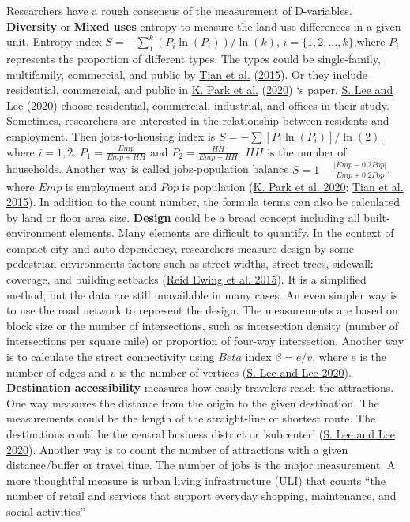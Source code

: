 \documentclass[
  12pt,
]{article}
\begin{document}
Researchers have a rough consensus of the measurement of D-variables. \textbf{Diversity} or \textbf{Mixed uses} entropy to measure the land-use differences in a given unit. Entropy index \(S= -\sum_1^k(P_i\ln(P_i))/\ln(k)\), \(i =\{1,2,...,k\}\),where \(P_i\)represents the proportion of different types. The types could be single-family, multifamily, commercial, and public by \protect\hyperlink{ref-tianTrafficGeneratedMixedUse2015}{Tian et al.} (\protect\hyperlink{ref-tianTrafficGeneratedMixedUse2015}{2015}). Or they include residential, commercial, and public in \protect\hyperlink{ref-parkGuidelinesPolycentricRegion2020}{K. Park et al.} (\protect\hyperlink{ref-parkGuidelinesPolycentricRegion2020}{2020}) `s paper. \protect\hyperlink{ref-leeComparingImpactsLocal2020}{S. Lee and Lee} (\protect\hyperlink{ref-leeComparingImpactsLocal2020}{2020}) choose residential, commercial, industrial, and offices in their study. Sometimes, researchers are interested in the relationship between residents and employment. Then jobs-to-housing index is \(S= -\sum[P_i\ln(P_i)]/\ln(2)\), where \(i=1,2\). \(P_1=\frac{Emp}{Emp+HH}\) and \(P_2=\frac{HH}{Emp+HH}\). \(HH\) is the number of households. Another way is called jobs-population balance \(S= 1-\frac{|Emp-0.2 Pop|}{Emp+0.2 Pop}\), where \(Emp\) is employment and \(Pop\) is population (\protect\hyperlink{ref-parkGuidelinesPolycentricRegion2020}{K. Park et al. 2020}; \protect\hyperlink{ref-tianTrafficGeneratedMixedUse2015}{Tian et al. 2015}). In addition to the count number, the formula terms can also be calculated by land or floor area size. \textbf{Design} could be a broad concept including all built-environment elements. Many elements are difficult to quantify. In the context of compact city and auto dependency, researchers measure design by some pedestrian-environments factors such as street widths, street trees, sidewalk coverage, and building setbacks (\protect\hyperlink{ref-ewingVaryingInfluencesBuilt2015}{Reid Ewing et al. 2015}). It is a simplified method, but the data are still unavailable in many cases. An even simpler way is to use the road network to represent the design. The measurements are based on block size or the number of intersections, such as intersection density (number of intersections per square mile) or proportion of four-way intersection. Another way is to calculate the street connectivity using \(Beta\) index \(\beta= e/v\), where \(e\) is the number of edges and \(v\) is the number of vertices (\protect\hyperlink{ref-leeComparingImpactsLocal2020}{S. Lee and Lee 2020}). \textbf{Destination accessibility} measures how easily travelers reach the attractions. One way measures the distance from the origin to the given destination. The measurements could be the length of the straight-line or shortest route. The destinations could be the central business district or 'subcenter' (\protect\hyperlink{ref-leeComparingImpactsLocal2020}{S. Lee and Lee 2020}). Another way is to count the number of attractions with a given distance/buffer or travel time. The number of jobs is the major measurement. A more thoughtful measure is urban living infrastructure (ULI) that counts ``the number of retail and services that support everyday shopping, maintenance, and social activities'' 
\end{document}
